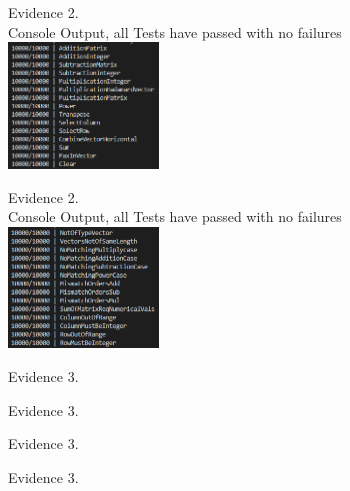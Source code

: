 \begin{flushleft}
\begin{center}
        {\large Evidence 2.\rn } \\ 
        \vspace{0.3cm}
        Console Output, all Tests have passed with no failures \\
        \includegraphics[width=4cm]{Images/Testing/T2.18.1.PNG} \\
        \vspace{1cm}

        {\large Evidence 2.\rn } \\ 
        \vspace{0.3cm}
        Console Output, all Tests have passed with no failures \\
        \includegraphics[width=4cm]{Images/Testing/T2.19.1.PNG} \\
        \vspace{1cm}
    \end{center}

    \setcounter{magicrownumbers}{0}
    \begin{center}
        {\large Evidence 3.\rn } \\ 
        \vspace{0.3cm}
        \vspace{1cm}
        
        {\large Evidence 3.\rn } \\ 
        \vspace{0.3cm}
        \vspace{1cm}

        {\large Evidence 3.\rn } \\ 
        \vspace{0.3cm}
        \vspace{1cm}

        {\large Evidence 3.\rn } \\ 
        \vspace{0.3cm}
        \vspace{1cm}


\end{center}
\end{flushleft}
